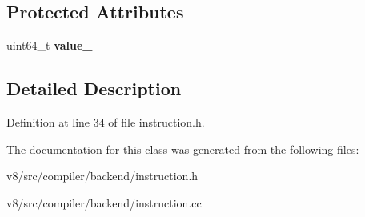 \subsection*{Protected Attributes}
\begin{DoxyCompactItemize}
\item 
\mbox{\label{classv8_1_1internal_1_1compiler_1_1InstructionOperand_a4152277dc0b28ea539e0aab97dfff29b}} 
uint64\+\_\+t {\bfseries value\+\_\+}
\end{DoxyCompactItemize}


\subsection{Detailed Description}


Definition at line 34 of file instruction.\+h.



The documentation for this class was generated from the following files\+:\begin{DoxyCompactItemize}
\item 
v8/src/compiler/backend/instruction.\+h\item 
v8/src/compiler/backend/instruction.\+cc\end{DoxyCompactItemize}
